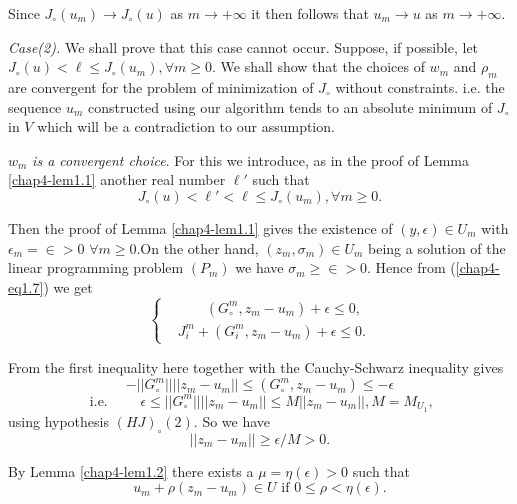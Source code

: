 Since $J_{\circ} (u_{m}) \to J_{\circ}(u)$ as $m \to + \infty$ it then follows that $u_{m} \to u$ as $m \to + \infty$.

{\em Case(2).} We shall prove that this case cannot occur. Suppose, if possible, let $J_{\circ}(u) < \ell \leq J_{\circ}(u_{m}), \forall m \geq 0$. We shall show that the choices of $w_{m}$ and $\rho_{m}$ are convergent for the problem of minimization of $J_{\circ}$ without constraints. i.e. the sequence $u_{m}$ constructed using our algorithm tends to an absolute minimum of $J_{\circ}$ in $V$ which will be a contradiction to our assumption.

$w_{m}$ {\em is a convergent choice}. For this we introduce, as in the proof of Lemma \ref{chap4-lem1.1} another real number $\ell'$ such that
$$
J_{\circ}(u) < \ell' < \ell \leq J_{\circ}(u_{m}), \forall m \geq 0.
$$

Then the proof of Lemma \ref{chap4-lem1.1} gives the existence of $(y, \epsilon) \in U_{m}$ with $\epsilon_{m} = \in > 0$ $\forall m \geq 0$.\pageoriginale On the other hand, $(z_{m}, \sigma_{m}) \in U_{m}$ being a solution of the linear programming problem $(P_{m})$ we have $\sigma_{m} \geq \in > 0$. Hence from (\ref{chap4-eq1.7}) we get
\begin{equation*}
\begin{cases}
& \qquad (G_{\circ}^{m}, z_{m}-u_{m}) + \epsilon \leq 0,\\
& J_{i}^{m} + (G_{i}^{m}, z_{m}-u_{m}) + \epsilon \leq 0.\tag{1.16}\label{chap4-eq1.16}
\end{cases}
\end{equation*}

From the first inequality here together with the Cauchy-Schwarz inequality gives
$$
-||G_{\circ}^{m}|| ||z_{m}-u_{m}|| \leq (G_{\circ}^{m}, z_{m}-u_{m}) \leq - \epsilon
$$
\begin{equation*}
\text{ i.e. }\qquad \epsilon \leq ||G_{\circ}^{m}|| ||z_{m}-u_{m}|| \leq M ||z_{m}-u_{m}||, M = M_{U_{1}},
\end{equation*}
using hypothesis $(HJ)_{\circ} (2)$. So we have
\begin{equation*}
||z_{m} - u_{m}|| \geq \epsilon / M > 0.\tag{1.17}\label{chap4-eq1.17}
\end{equation*}

By Lemma \ref{chap4-lem1.2} there exists a $\mu = \eta(\epsilon) > 0$ such that
\begin{equation*}
u_{m} + \rho(z_{m}-u_{m}) \in U \text{ if } 0 \leq \rho < \eta(\epsilon).\tag{1.10}
\end{equation*}

